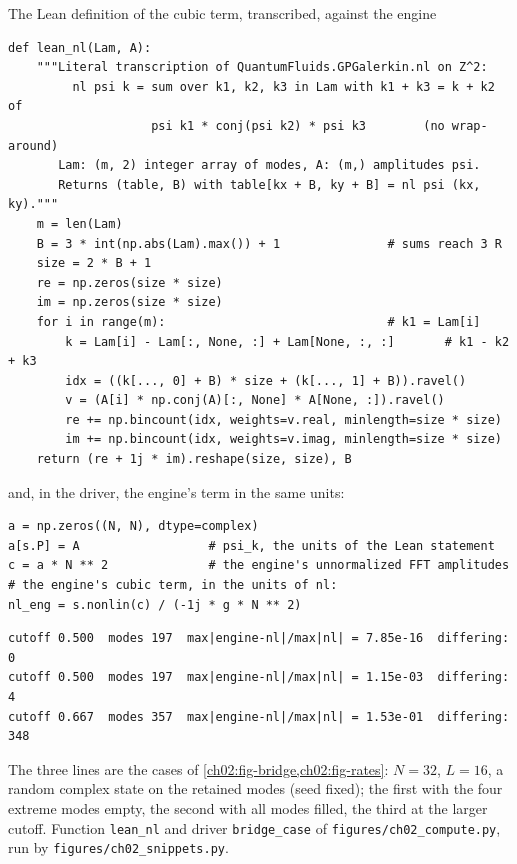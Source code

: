 \begin{rustbox}{The Lean definition of the cubic term, transcribed, against the engine}
\begin{lstlisting}[style=py]
def lean_nl(Lam, A):
    """Literal transcription of QuantumFluids.GPGalerkin.nl on Z^2:
         nl psi k = sum over k1, k2, k3 in Lam with k1 + k3 = k + k2 of
                    psi k1 * conj(psi k2) * psi k3        (no wrap-around)
       Lam: (m, 2) integer array of modes, A: (m,) amplitudes psi.
       Returns (table, B) with table[kx + B, ky + B] = nl psi (kx, ky)."""
    m = len(Lam)
    B = 3 * int(np.abs(Lam).max()) + 1               # sums reach 3 R
    size = 2 * B + 1
    re = np.zeros(size * size)
    im = np.zeros(size * size)
    for i in range(m):                               # k1 = Lam[i]
        k = Lam[i] - Lam[:, None, :] + Lam[None, :, :]       # k1 - k2 + k3
        idx = ((k[..., 0] + B) * size + (k[..., 1] + B)).ravel()
        v = (A[i] * np.conj(A)[:, None] * A[None, :]).ravel()
        re += np.bincount(idx, weights=v.real, minlength=size * size)
        im += np.bincount(idx, weights=v.imag, minlength=size * size)
    return (re + 1j * im).reshape(size, size), B
\end{lstlisting}
and, in the driver, the engine's term in the same units:
\begin{lstlisting}[style=py]
a = np.zeros((N, N), dtype=complex)
a[s.P] = A                  # psi_k, the units of the Lean statement
c = a * N ** 2              # the engine's unnormalized FFT amplitudes
# the engine's cubic term, in the units of nl:
nl_eng = s.nonlin(c) / (-1j * g * N ** 2)
\end{lstlisting}
\begin{lstlisting}[style=plainmono]
cutoff 0.500  modes 197  max|engine-nl|/max|nl| = 7.85e-16  differing: 0
cutoff 0.500  modes 197  max|engine-nl|/max|nl| = 1.15e-03  differing: 4
cutoff 0.667  modes 357  max|engine-nl|/max|nl| = 1.53e-01  differing: 348
\end{lstlisting}
The three lines are the cases of \cref{ch02:fig-bridge,ch02:fig-rates}: $N=32$, $L=16$, a random complex state on the retained modes (seed fixed); the first with the four extreme modes empty, the second with all modes filled, the third at the larger cutoff.
Function \texttt{lean\_nl} and driver \texttt{bridge\_case} of \texttt{figures/ch02\_compute.py}, run by \texttt{figures/ch02\_snippets.py}.
\end{rustbox}

